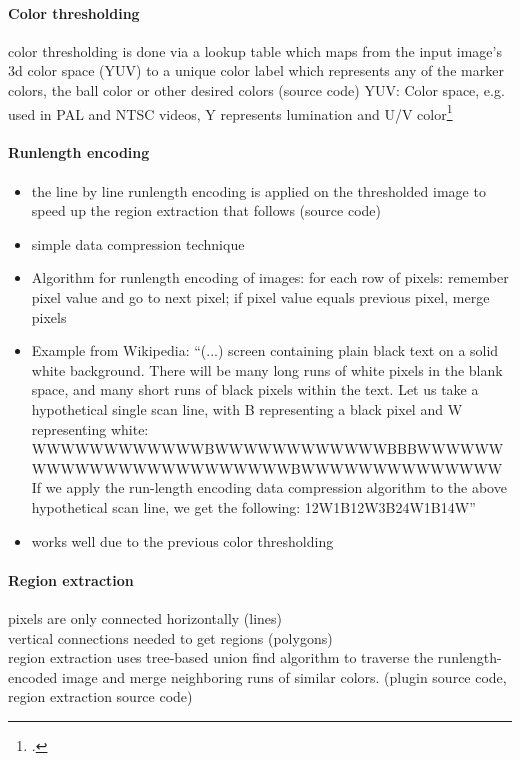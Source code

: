 \paragraph{Color thresholding}
color thresholding is done via a lookup table which maps from the input image’s
3d color space (YUV) to a unique color label which represents any of the marker
colors, the ball color or other desired colors (source code) YUV: Color space,
e.g. used in PAL and NTSC videos, Y represents lumination and U/V color\footcite[Cf.][]{zickler_ssl_vision}

\paragraph{Runlength encoding}

\begin{itemize}
  \item the line by line runlength encoding is applied on the thresholded image to speed up the region extraction that follows (source code)
  \item simple data compression technique
  \item Algorithm for runlength encoding of images:
for each row of pixels:
remember pixel value and go to next pixel;
if pixel value equals previous pixel, merge pixels
  \item Example from Wikipedia:
“(...) screen containing plain black text on a solid white background. There will be many long runs of white pixels in the blank space, and many short runs of black pixels within the text. Let us take a hypothetical single scan line, with B representing a black pixel and W representing white:
WWWWWWWWWWWWBWWWWWWWWWWWWBBBWWWWWWWWWWWWWWWWWWWWWWWWBWWWWWWWWWWWWWW
If we apply the run-length encoding data compression algorithm to the above hypothetical scan line, we get the following:
12W1B12W3B24W1B14W”
  \item works well due to the previous color thresholding
\end{itemize}

\paragraph{Region extraction}

pixels are only connected horizontally (lines)\\
vertical connections needed to get regions (polygons)\\
region extraction uses tree-based union find algorithm to traverse the
runlength-encoded image and merge neighboring runs of similar colors. (plugin
source code, region extraction source code)\\



